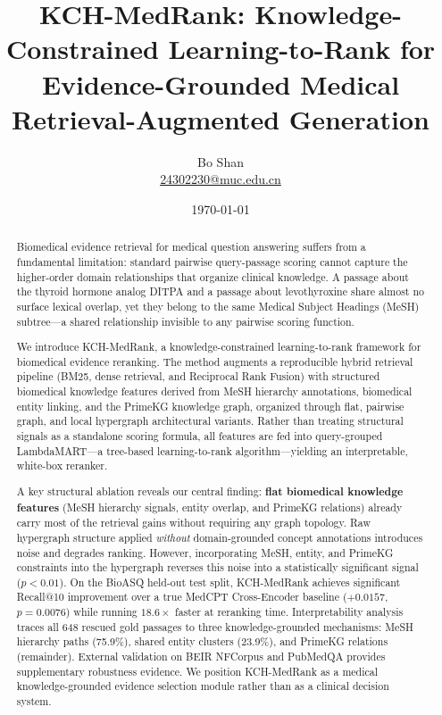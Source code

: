 \documentclass[11pt]{article}
\title{KCH-MedRank: Knowledge-Constrained Learning-to-Rank for Evidence-Grounded Medical Retrieval-Augmented Generation}
\author{Bo Shan\\\href{mailto:24302230@muc.edu.cn}{24302230@muc.edu.cn}}
\date{\today}
\begin{document}
\maketitle

\begin{abstract}
Biomedical evidence retrieval for medical question answering suffers from a fundamental limitation: standard pairwise query-passage scoring cannot capture the higher-order domain relationships that organize clinical knowledge. A passage about the thyroid hormone analog DITPA and a passage about levothyroxine share almost no surface lexical overlap, yet they belong to the same Medical Subject Headings (MeSH) subtree---a shared relationship invisible to any pairwise scoring function.

We introduce KCH-MedRank, a knowledge-constrained learning-to-rank framework for biomedical evidence reranking. The method augments a reproducible hybrid retrieval pipeline (BM25, dense retrieval, and Reciprocal Rank Fusion) with structured biomedical knowledge features derived from MeSH hierarchy annotations, biomedical entity linking, and the PrimeKG knowledge graph, organized through flat, pairwise graph, and local hypergraph architectural variants. Rather than treating structural signals as a standalone scoring formula, all features are fed into query-grouped LambdaMART---a tree-based learning-to-rank algorithm---yielding an interpretable, white-box reranker.

A key structural ablation reveals our central finding: \textbf{flat biomedical knowledge features} (MeSH hierarchy signals, entity overlap, and PrimeKG relations) already carry most of the retrieval gains without requiring any graph topology. Raw hypergraph structure applied \textit{without} domain-grounded concept annotations introduces noise and degrades ranking. However, incorporating MeSH, entity, and PrimeKG constraints into the hypergraph reverses this noise into a statistically significant signal ($p < 0.01$). On the BioASQ held-out test split, KCH-MedRank achieves significant Recall@10 improvement over a true MedCPT Cross-Encoder baseline ($+0.0157$, $p=0.0076$) while running $18.6\times$ faster at reranking time. Interpretability analysis traces all 648 rescued gold passages to three knowledge-grounded mechanisms: MeSH hierarchy paths (75.9\%), shared entity clusters (23.9\%), and PrimeKG relations (remainder). External validation on BEIR NFCorpus and PubMedQA provides supplementary robustness evidence. We position KCH-MedRank as a medical knowledge-grounded evidence selection module rather than as a clinical decision system.
\end{abstract}











\appendix




\end{document}
